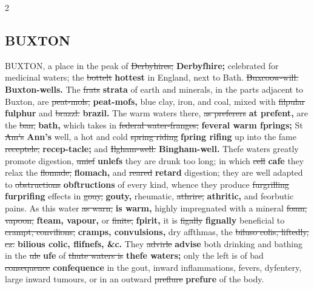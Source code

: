 \documentclass[10pt]{article}
\begin{document}
\begin{multicols}{2}
\subsection*{BUXTON}
BUXTON, a place in the peak of \sout{Derbyhires;} \textbf{Derbyfhire;} celebrated for medicinal waters; the \sout{bottelt} \textbf{hottest} in England, next to Bath. \sout{Buxcoow-will.} \textbf{Buxton-wells.} The \sout{frats} \textbf{strata} of earth and minerals, in the parts adjacent to Buxton, are \sout{peat-mols,} \textbf{peat-mofs,} blue clay, iron, and coal, mixed with \sout{filpular} \textbf{fulphur} and \sout{brazzl.} \textbf{brazil.} The warm waters there, \sout{as preferers} \textbf{at prefent,} are the \sout{ban,} \textbf{bath,} which takes in \sout{federal water-franges;} \textbf{feveral warm fprings;} St \sout{Am’s} \textbf{Ann's} well, a hot and cold \sout{spring riding} \textbf{fpring rifing} up into the fame \sout{receptele,} \textbf{recep-tacle;} and \sout{Ilgham-well.} \textbf{Bingham-well.} Thefe waters greatly promote digestion, \sout{unief} \textbf{unlefs} they are drunk too long; in which \sout{cell} \textbf{cafe} they relax the \sout{flomade,} \textbf{flomach,} and \sout{reared} \textbf{retard} digestion; they are well adapted to \sout{obstructions} \textbf{obftructions} of every kind, whence they produce \sout{furgrilling} \textbf{furprifing} effects in \sout{gouy,} \textbf{gouty,} rheumatic, \sout{athrire,} \textbf{athritic,} and feorbutic pains. As this water \sout{as warn,} \textbf{is warm,} highly impregnated with a mineral \sout{foam, vapoon,} \textbf{fteam, vapour,} or \sout{finite,} \textbf{fpirit,} it is \sout{figally} \textbf{fignally} beneficial to \sout{crampt, convilions,} \textbf{cramps, convulsions,} dry affthmas, the \sout{biluso colis, liftedly, cz.} \textbf{bilious colic, flifnefs, \&c.} They \sout{advirle} \textbf{advise} both drinking and bathing in the \sout{ule} \textbf{ufe} of \sout{thute waters is} \textbf{thefe waters;} only the left is of bad \sout{consequence} \textbf{confequence} in the gout, inward inflammations, fevers, dyfentery, large inward tumours, or in an outward \sout{preflure} \textbf{prefure} of the body.


\end{multicols}
\end{document}
